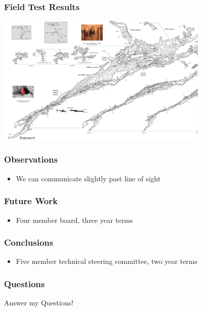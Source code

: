 \documentclass{beamer}
\begin{document}
\begin{frame}
	\frametitle{Field Test Results}

\begin{center}
\includegraphics[width=4.0in]{../images/New-River-June-4-2024.png}
\end{center}

\end{frame}


\begin{frame}

\frametitle{Observations}

\begin{itemize}
\item We can communicate slightly past line of sight
\end{itemize}

\end{frame}

\begin{frame}
\frametitle{Future Work}

\begin{itemize}
\item Four member board, three year terms
\end{itemize}

\end{frame}


\begin{frame}
\frametitle{Conclusions}

\begin{itemize}
\item Five member technical steering committee, two year terms
\end{itemize}
\end{frame}

\begin{frame}
\frametitle{Questions}

Answer my Questions!

\end{frame}
\end{document}
